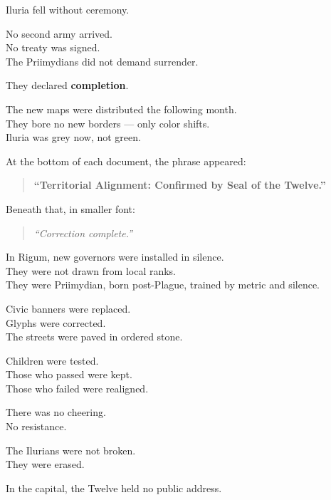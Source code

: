 \documentclass[12pt]{article}
\begin{document}
Iluria fell without ceremony.

No second army arrived.\\
No treaty was signed.\\
The Priimydians did not demand surrender.

They declared \textbf{completion}.

\vspace{1em}

The new maps were distributed the following month.\\
They bore no new borders — only color shifts.\\
Iluria was grey now, not green.

At the bottom of each document, the phrase appeared:

\begin{quote}
\textbf{“Territorial Alignment: Confirmed by Seal of the Twelve.”}
\end{quote}

Beneath that, in smaller font:

\begin{quote}
\textit{“Correction complete.”}
\end{quote}

\vspace{1em}

In Rigum, new governors were installed in silence.\\
They were not drawn from local ranks.\\
They were Priimydian, born post-Plague, trained by metric and silence.

Civic banners were replaced.\\
Glyphs were corrected.\\
The streets were paved in ordered stone.

Children were tested.\\
Those who passed were kept.\\
Those who failed were realigned.

\vspace{1em}

There was no cheering.\\
No resistance.

The Ilurians were not broken.\\
They were erased.

\vspace{1em}

In the capital, the Twelve held no public address.
\end{document}

